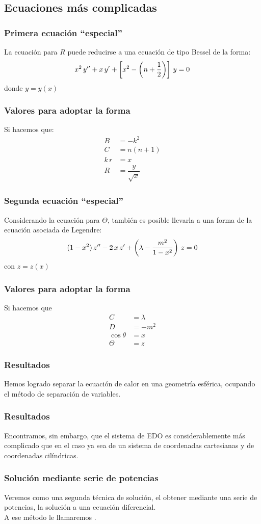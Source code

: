 \documentclass[12pt]{beamer}
\begin{document}
\subsection{Ecuaciones más complicadas}
\begin{frame}
\frametitle{Primera ecuación \enquote{especial}}
La ecuación para $R$ puede reducirse a una ecuación de tipo Bessel de la forma:
\begin{align}
x^{2} \, {y}^{\prime \prime} + x \, {y}^{\prime} + \left[ x^{2} - \left( n + \dfrac{1}{2} \right) \right] \, y = 0
\label{eq:ecuacion_02_304}
\end{align}
donde $y = y(x)$
\end{frame}
\begin{frame}
\frametitle{Valores para adoptar la forma}
Si hacemos que:
\begin{align*}
B &= -k^{2} \\[0.5em]
C &= n(n + 1) \\[0.5em]
k \, r &= x \\[0.5em]
R &= \dfrac{y}{\sqrt{x}}
\end{align*}
\end{frame}
\begin{frame}
\frametitle{Segunda ecuación \enquote{especial}}
Considerando la ecuación para $\Theta$, también es posible llevarla a una forma de la ecuación asociada de Legendre:
\begin{align*}
(1 - x^{2}) \, {z}^{\prime \prime} - 2 \, x \, {z}^{\prime} + \left( \lambda - \dfrac{m^{2}}{1 -x^{2}} \right) \, z = 0
\label{eq:ecuacion_02_305}
\end{align*}
con $z = z(x)$
\end{frame}
\begin{frame}
\frametitle{Valores para adoptar la forma}
Si hacemos que
\begin{align*}
C &= \lambda \\[0.5em]
D &= - m^{2} \\[0.5em]
\cos \theta &= x \\[0.5em]
\Theta &= z
\end{align*}
\end{frame}
\begin{frame}
\frametitle{Resultados}
Hemos logrado separar la ecuación de calor en una geometría esférica, ocupando el método de separación de variables.
\end{frame}
\begin{frame}
\frametitle{Resultados}
Encontramos, sin embargo, que el sistema de EDO es considerablemente más complicado que en el caso ya sea de un sistema de coordenadas cartesianas y de  coordenadas cilíndricas.
\end{frame}
\begin{frame}
\frametitle{Solución mediante serie de potencias}
Veremos como una segunda técnica de solución, el obtener mediante una serie de potencias, la solución a una ecuación diferencial.
\\
\bigskip
\pause
A ese método le llamaremos .
\end{frame}
\end{document}
